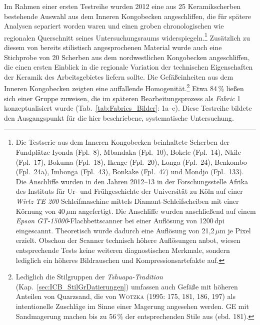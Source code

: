 \begin{multicols}{2}
Im Rahmen einer ersten Testreihe wurden 2012 eine aus 25 Keramikscherben bestehende Auswahl aus dem Inneren Kongobecken angeschliffen, die für spätere Analysen separiert worden waren und einen groben chronologischen wie regionalen Querschnitt seines Untersuchungsraums widerspiegeln.\footnote{Die Testserie aus dem Inneren Kongobecken beinhaltete Scherben der Fundplätze Iyonda (Fpl.~8), Mbandaka (Fpl.~10), Bokele (Fpl.~14), Nkile (Fpl.~17), Bokuma (Fpl.~18), Ikenge (Fpl.~20), Longa (Fpl.~24), Benkombo (Fpl.~24a), Imbonga (Fpl.~43), Bonkake (Fpl.~47) und Mondjo (Fpl.~133). Die Anschliffe wurden in den Jahren 2012--13 in der Forschungsstelle Afrika des Instituts für Ur- und Frühgeschichte der Universität zu Köln auf einer \textit{Wirtz TE 200} Schleifmaschine mittels Diamant-Schleifscheiben mit einer Körnung von 40\,$\mu$m angefertigt. Die Anschliffe wurden anschließend auf einem \textit{Epson GT-15000}-Flachbettscanner bei einer Auflösung von 1200\,dpi eingescannt. Theoretisch wurde dadurch eine Auflösung von 21,2\,$\mu$m je Pixel erzielt. Obschon der Scanner technisch höhere Auflösungen anbot, wiesen entsprechende Tests keine weiteren diagnostischen Merkmale, sondern lediglich ein höheres Bildrauschen und Kompressionsartefakte auf.\label{ftn:Anschliffe2012_ICB_Fpl}} Zusätzlich zu diesem von \textcite{Wotzka.1995} bereits stilistisch angesprochenen Material wurde auch eine Stichprobe von 20 Scherben aus dem nordwestlichen Kongobecken angeschliffen, die einen ersten Einblick in die regionale Variation der technischen Eigenschaften der Keramik des Arbeitsgebietes liefern sollte. Die Gefäßeinheiten aus dem Inneren Kongobecken zeigten eine auffallende Homogenität.\footnote{Lediglich die Stilgruppen der \textit{Tshuapa-Tradition} (Kap.~\ref{sec:ICB_StilGrDatierungen}) umfassen auch Gefäße mit höheren Anteilen von Quarzsand, die von \textsc{Wotzka} (1995: 175, 181, 186, 197) als intentionelle Zuschläge im Sinne einer Magerung angesehen werden. GE mit Sandmagerung machen bis zu 56\,\% der entsprechenden Stile aus (ebd. 181).\label{ftn:Sandmagerung}} Etwa 84\,\% ließen sich einer Gruppe zuweisen, die im späteren Bearbeitungsprozess als \textit{Fabric} 1 konzeptualisiert wurde (Tab.~\ref{tab:Fabrics_Bilder}: 1a--e). Diese Testreihe bildete den Ausgangspunkt für die hier beschriebene, systematische Untersuchung.


\end{multicols}
